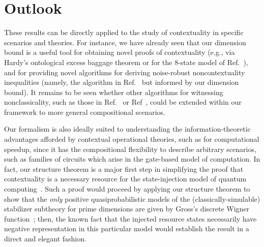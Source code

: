\documentclass[10pt,twocolumn,aps,groupedaddress,nofootinbib]{revtex4}
\newcommand{\rob}{\color{cyan}}
\newcommand{\blk}{\color{black}}
\begin{document}
\section{Outlook}


These results can be directly applied to the study of contextuality in specific scenarios and theories. For instance, we have already seen that our dimension bound is a useful tool for obtaining novel proofs of contextuality (e.g., via Hardy's ontological excess baggage theorem \cite{Hardy2004} or for the 8-state model of Ref.~\cite{8state}), and for providing novel algorithms for deriving noise-robust noncontextuality inequalities (namely, the algorithm in Ref.~\cite{schmid2019characterization} but informed by our dimension bound).
 It remains to be seen whether other algorithms for witnessing nonclassicality, such as those in Ref.~\cite{Schmid2018} or Ref~\cite{Krishna_2017}, could be extended within our framework to more general compositional scenarios.

Our formalism is also ideally suited to understanding the information-theoretic advantages afforded by  contextual operational theories, such as for computational speedup, since it has the compositional flexibility to describe arbitrary scenarios, such as families of circuits which arise in the gate-based model of computation.
In fact, our structure theorem is a major first step in simplifying the proof that contextuality is a necessary resource for the state-injection model of quantum computing~\cite{magic}. Such a proof would proceed by applying our structure theorem to show that the {\em only} positive quasiprobabilistic models of the (classically-simulable) stabilizer subtheory for prime dimensions are given by Gross's discrete Wigner function~\cite{Grossunique}; then, the known fact that the injected resource states necessarily have negative representation in this particular model would establish the result in a direct and elegant fashion.
\end{document}
